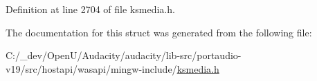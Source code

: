 Definition at line 2704 of file ksmedia.\+h.



The documentation for this struct was generated from the following file\+:\begin{DoxyCompactItemize}
\item 
C\+:/\+\_\+dev/\+Open\+U/\+Audacity/audacity/lib-\/src/portaudio-\/v19/src/hostapi/wasapi/mingw-\/include/\hyperlink{ksmedia_8h}{ksmedia.\+h}\end{DoxyCompactItemize}
